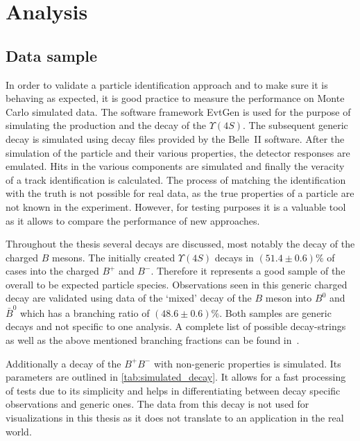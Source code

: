 \chapter{Analysis}
\label{chap:analysis}

\section{Data sample}
\label{sec:data_sample}

In order to validate a particle identification approach and to make sure it is behaving as expected, it is good practice to measure the performance on Monte Carlo simulated data. The software framework EvtGen is used for the purpose of simulating the production and the decay of the $\Upsilon(4S)$. The subsequent generic decay is simulated using decay files provided by the Belle~\RN{2} software. After the simulation of the particle and their various properties, the detector responses are emulated. Hits in the various components are simulated and finally the veracity of a track identification is calculated. The process of matching the identification with the truth is not possible for real data, as the true properties of a particle are not known in the experiment. However, for testing purposes it is a valuable tool as it allows to compare the performance of new approaches.

Throughout the thesis several decays are discussed, most notably the decay of the charged $B$ mesons. The initially created $\Upsilon(4S)$ decays in $(51.4 \pm 0.6) \%$ of cases into the charged $B^+$ and $B^-$. Therefore it represents a good sample of the overall to be expected particle species. Observations seen in this generic charged decay are validated using data of the `mixed' decay of the $B$ meson into $B^0$ and $\bar{B}^0$ which has a branching ratio of $(48.6 \pm 0.6) \%$. Both samples are generic decays and not specific to one analysis. A complete list of possible decay-strings as well as the above mentioned branching fractions can be found in~\cite{Patrignani:2016xqp}.

Additionally a decay of the $B^+ B^-$ with non-generic properties is simulated. Its parameters are outlined in \autoref{tab:simulated_decay}. It allows for a fast processing of tests due to its simplicity and helps in differentiating between decay specific observations and generic ones. The data from this decay is not used for visualizations in this thesis as it does not translate to an application in the real world.


